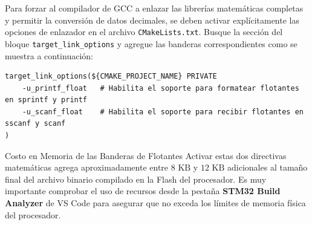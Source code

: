 \documentclass[
10pt, %
a4paper, %
oneside, %
headinclude,footinclude, %
BCOR5mm, %
]{scrartcl}
\begin{document}
Para forzar al compilador de GCC a enlazar las librerías matemáticas completas y permitir la conversión de datos decimales, se deben activar explícitamente las opciones de enlazador en el archivo \texttt{CMakeLists.txt}. Busque la sección del bloque \texttt{target\_link\_options} y agregue las banderas correspondientes como se muestra a continuación:

\begin{lstlisting}[style=CMakeStyle]
target_link_options(${CMAKE_PROJECT_NAME} PRIVATE
    -u_printf_float   # Habilita el soporte para formatear flotantes en sprintf y printf
    -u_scanf_float    # Habilita el soporte para recibir flotantes en sscanf y scanf
)
\end{lstlisting}

\begin{InfoBox}{Costo en Memoria de las Banderas de Flotantes}
	Activar estas dos directivas matemáticas agrega aproximadamente entre $8\text{ KB}$ y $12\text{ KB}$ adicionales al tamaño final del archivo binario compilado en la Flash del procesador. Es muy importante comprobar el uso de recursos desde la pestaña \textbf{STM32 Build Analyzer} de VS Code para asegurar que no exceda los límites de memoria física del procesador.
\end{InfoBox}



%


\end{document}
